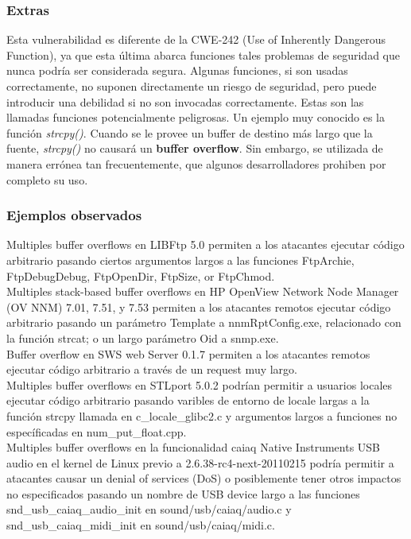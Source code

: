 \subsubsection{Extras}

Esta vulnerabilidad es diferente de la CWE-242 (Use of Inherently Dangerous Function), ya que esta última abarca funciones tales problemas de seguridad que nunca podría ser
considerada segura. Algunas funciones, si son usadas correctamente, no suponen directamente un riesgo de seguridad, pero puede introducir una debilidad si no son
invocadas correctamente. Estas son las llamadas funciones potencialmente peligrosas. Un ejemplo muy conocido es la función \textit{strcpy()}. Cuando se le provee un buffer
de destino más largo que la fuente, \textit{strcpy()} no causará un \textbf{buffer overflow}. Sin embargo, se utilizada de manera errónea tan frecuentemente, que algunos desarrolladores
prohiben por completo su uso.

\subsubsection{Ejemplos observados}

Multiples buffer overflows en LIBFtp 5.0 permiten a los atacantes ejecutar código arbitrario pasando ciertos argumentos largos a las funciones FtpArchie, 
FtpDebugDebug, FtpOpenDir, FtpSize, or FtpChmod.\\

Multiples stack-based buffer overflows en HP OpenView Network Node Manager (OV NNM) 7.01, 7.51, y 7.53 permiten a los atacantes remotos ejecutar código arbitrario
pasando un parámetro Template a  nnmRptConfig.exe, relacionado con la función strcat; o un largo parámetro Oid a snmp.exe.\\

Buffer overflow en SWS web Server 0.1.7 permiten a los atacantes remotos ejecutar código arbitrario a través de un request muy largo.\\

Multiples buffer overflows en STLport 5.0.2 podrían permitir a usuarios locales ejecutar código arbitrario pasando varibles de entorno de locale largas a la función
strcpy llamada en c\_locale\_glibc2.c y argumentos largos a funciones no específicadas en num\_put\_float.cpp.\\
 
Multiples buffer overflows en la funcionalidad caiaq Native Instruments USB audio en el kernel de Linux previo a 2.6.38-rc4-next-20110215 podría permitir a
atacantes causar un denial of services (DoS) o posiblemente tener otros impactos no especificados pasando un nombre de USB device largo a las funciones
snd\_usb\_caiaq\_audio\_init en sound/usb/caiaq/audio.c y snd\_usb\_caiaq\_midi\_init en sound/usb/caiaq/midi.c.\\

